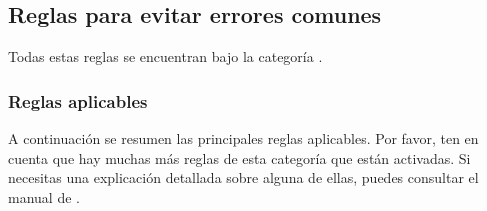 \subsection{Reglas para evitar errores comunes}

Todas estas reglas se encuentran bajo la categoría .

\subsubsection{Reglas aplicables}

A continuación se resumen las principales reglas aplicables.
Por favor, ten en cuenta que hay muchas más reglas de esta categoría que están 
activadas. Si necesitas una explicación detallada sobre alguna de ellas,
puedes consultar el manual de .

